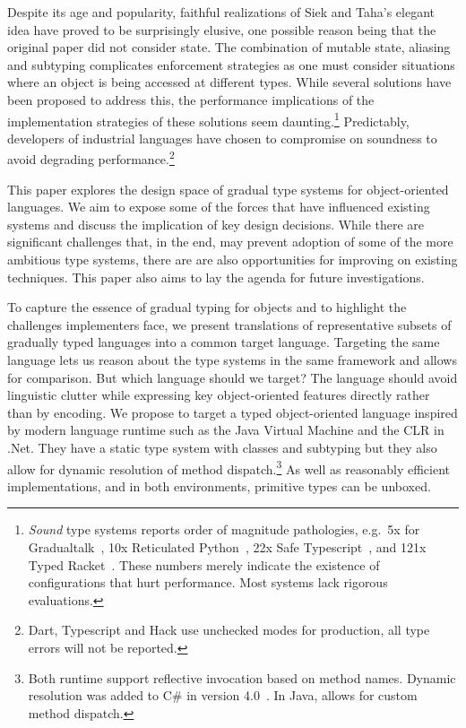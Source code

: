 \documentclass[a4paper,USenglish]{tex/lipics-v2016}
\begin{document}
Despite its age and popularity, faithful realizations of Siek and Taha's
elegant idea have proved to be surprisingly elusive, one possible reason
being that the original paper did not consider state. The combination of
mutable state, aliasing and subtyping complicates enforcement strategies as
one must consider situations where an object is being accessed at different
types. While several solutions have been proposed to address this, the
performance implications of the implementation strategies of these solutions
seem daunting.\footnote{\emph{Sound} type systems reports order of magnitude
  pathologies, e.g.~5x for Gradualtalk~\cite{allende13}, 10x Reticulated
  Python~\cite{siek14}, 22x Safe Typescript~\cite{safe-typescript}, and 121x
  Typed Racket~\cite{popl16}. These numbers merely indicate the existence of
  configurations that hurt performance.  Most systems lack rigorous
  evaluations. } Predictably, developers of industrial languages have chosen
to compromise on soundness to avoid degrading performance.\footnote{Dart,
  Typescript and Hack use unchecked modes for production, all type errors
  will not be reported.}

This paper explores the design space of gradual type systems for object-oriented
languages. We aim to expose some of the forces that have influenced existing
systems and discuss the implication of key design decisions. While there are
significant challenges that, in the end, may prevent adoption of some of the
more ambitious type systems, there are are also opportunities for improving on
existing techniques.  This paper also aims to lay the agenda for future
investigations.

To capture the essence of gradual typing for objects and to highlight the
challenges implementers face, we present translations of representative subsets
of gradually typed languages into a common target language. Targeting the same
language lets us reason about the type systems in the same framework and allows
for comparison. But which language should we target? The language should avoid
linguistic clutter while expressing key object-oriented features directly rather
than by encoding. We propose to target a typed object-oriented language
inspired by modern language runtime such as the Java Virtual Machine and the
CLR in .Net. They have a static type system with classes and subtyping but they
also allow for dynamic resolution of method dispatch.\footnote{Both runtime
support reflective invocation based on method names. Dynamic resolution was
added to C\# in version 4.0~\cite{BAT14}. In Java,  allows for
custom method dispatch.} As well as reasonably efficient implementations, and in
both environments, primitive types can be unboxed.
\end{document}
